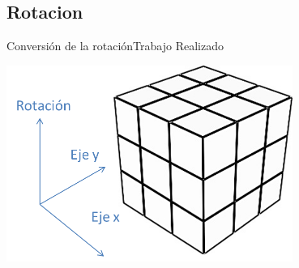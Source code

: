 \documentclass[10pt]{beamer}
\begin{document}
\subsection{Rotacion}
\begin{frame}{Conversión de la rotación}{Trabajo Realizado}
	\begin{center}	\includegraphics[width=0.7\textwidth,height=0.6\textheight,keepaspectratio]{rotacion}	
	\end{center}
\end{frame}
\end{document}
